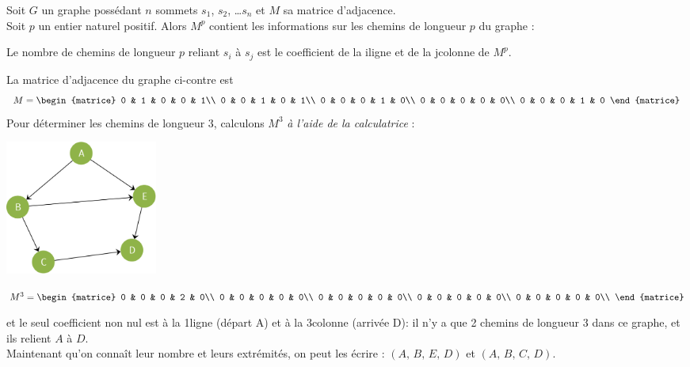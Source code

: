 \begin{propriete}[]
    Soit $G$ un graphe possédant $n$ sommets $s_1$, $s_2$, \ldots $s_n$ et $M$ sa matrice d'adjacence.\\
    Soit $p$ un entier naturel positif. Alors $M^p$ contient les informations sur les chemins de longueur $p$ du graphe :
    
    Le nombre de chemins de longueur $p$ reliant $s_i$ à $s_j$ est le coefficient de la i\eme ligne et de la j\eme colonne de $M^p$.
\end{propriete}

\begin{exemple}[]
    La matrice d'adjacence du graphe ci-contre est
    $$M=\begin{matrice}
            0 & 1 & 0 & 0 & 1\\
            0 & 0 & 1 & 0 & 1\\
            0 & 0 & 0 & 1 & 0\\
            0 & 0 & 0 & 0 & 0\\
            0 & 0 & 0 & 1 & 0
        \end{matrice}$$
    Pour déterminer les chemins de longueur 3, calculons $M^3$ \textit{à l'aide de la calculatrice} :
    \begin{center}
        \includegraphics[width=5cm]{graphes/img/exemple_Mp.png}
        
        
        $M^3 = \begin{matrice}
                0 & 0 & 0 & 2 & 0\\
                0 & 0 & 0 & 0 & 0\\
                0 & 0 & 0 & 0 & 0\\
                0 & 0 & 0 & 0 & 0\\
                0 & 0 & 0 & 0 & 0\\
            \end{matrice}$
    \end{center}
    et le seul coefficient non nul est à la 1\ere ligne (départ A) et à la 3\eme colonne (arrivée D): il n'y a que 2 chemins de longueur 3 dans ce graphe, et ils relient $A$ à $D$.\\
    Maintenant qu'on connaît leur nombre et leurs extrémités, on peut les écrire : $(A,\,B,\,E,\,D)$ et $(A,\,B,\,C,\,D)$.
\end{exemple}

